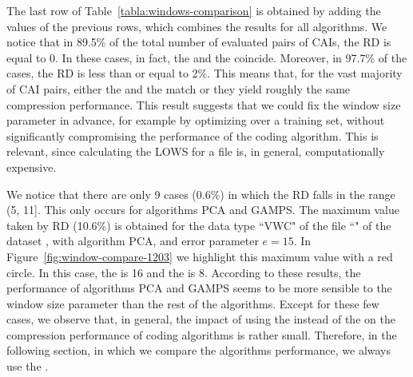 The last row of Table~\ref{tabla:windows-comparison} is obtained by adding the values of the previous rows, which combines the results for all algorithms. We notice that in 89.5\% of the total number of evaluated pairs of CAIs, the RD is equal to 0. In these cases, in fact, the \ows and the \lows coincide. Moreover, in 97.7\% of the cases, the RD is less than or equal to 2\%. This means that, for the vast majority of CAI pairs, either the \ows and the \lows match or they yield roughly the same compression performance. This result suggests that we could fix the window size parameter in advance, for example by optimizing over a training set, without significantly compromising the performance of the coding algorithm. This is relevant, since calculating the LOWS for a file is, in general, computationally expensive.


We notice that there are only 9 cases (0.6\%) in which the RD falls in the range (5, 11]. This only occurs for algorithms PCA and GAMPS. The maximum value taken by RD (10.6\%) is obtained for the data type ``VWC" of the file ``\fileIrkisTwo" of the dataset \datasetsst, with algorithm PCA, and error parameter $e=15$. In Figure~\ref{fig:window-compare-1203} we highlight this maximum value with a red circle. In this case, the \ows is 16 and the \lows is 8. According to these results, the performance of algorithms PCA and GAMPS seems to be more sensible to the window size parameter than the rest of the algorithms. Except for these few cases, we observe that, in general, the impact of using the \ows instead of the \lows on the compression performance of coding algorithms is rather small. Therefore, in the following section, in which we compare the algorithms performance, we always use the \owsns.


\clearpage

